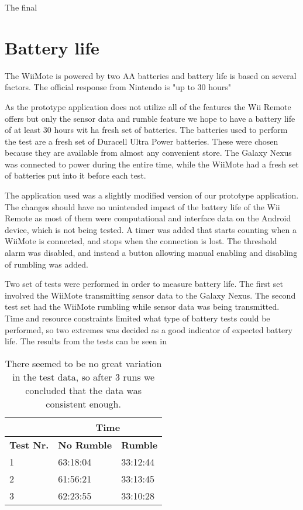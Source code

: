 The final 



\section{Battery life}
The WiiMote is powered by two AA batteries and battery life is based on several factors. The official response from Nintendo is "up to 30 hours" \cite{wiiBattery}

As the prototype application does not utilize all of the features the Wii Remote offers but only the sensor data and rumble feature we hope to have a battery life of at least 30 hours wit ha fresh set of batteries. The batteries used to perform the test are a fresh set of Duracell Ultra Power batteries. These were chosen because they are available from almost any convenient store. The Galaxy Nexus was connected to power during the entire time, while the WiiMote had a fresh set of batteries put into it before each test.

The application used was a slightly modified version of our prototype application. The changes should have no unintended impact of the battery life of the Wii Remote as most of them were computational and interface data on the Android device, which is not being tested. A timer was added that starts counting when a WiiMote is connected, and stops when the connection is lost. The threshold alarm was disabled, and instead a button allowing manual enabling and disabling of rumbling was added.

Two set of tests were performed in order to measure battery life. The first set involved the WiiMote transmitting sensor data to the Galaxy Nexus. The second test set had the WiiMote rumbling while sensor data was being transmitted. Time and resource constraints limited what type of battery tests could be performed, so two extremes was decided as a good indicator of expected battery life. The results from the tests can be seen in %

\begin{table}[h]
\centering
\setlength{\extrarowheight}{0,2cm}
\begin{tabular}{p{2cm}|p{4.75cm}|p{4.75cm}|}
\cline{2-3}
&\multicolumn{2}{c|}{\textbf{Time}}\\ \hline
\textbf{Test Nr.} &\textbf{No Rumble} & \textbf{Rumble} \\ \hline
1 & 63:18:04 & 33:12:44 \\ \hline
2 & 61:56:21 & 33:13:45 \\ \hline
3 & 62:23:55 & 33:10:28 \\ \hline
\end{tabular}
\caption{There seemed to be no great variation in the test data, so after 3 runs we concluded that the data was consistent enough.}
\label{}
\end{table}

